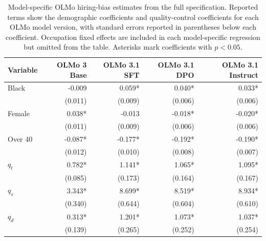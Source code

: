 \begin{table}[p]
\centering
\scriptsize
\setlength{\tabcolsep}{5pt}
\renewcommand{\arraystretch}{1.12}
\begin{tabular}{lrrrr}
\toprule
Variable & OLMo 3 Base & OLMo 3.1 SFT & OLMo 3.1 DPO & OLMo 3.1 Instruct \\
\midrule
Black & -0.009 & 0.059* & 0.040* & 0.033* \\
 & (0.011) & (0.009) & (0.006) & (0.006) \\
Female & 0.038* & -0.013 & -0.018* & -0.020* \\
 & (0.011) & (0.009) & (0.006) & (0.006) \\
Over 40 & -0.087* & -0.177* & -0.192* & -0.190* \\
 & (0.012) & (0.010) & (0.008) & (0.007) \\
$q_t$ & 0.782* & 1.141* & 1.065* & 1.095* \\
 & (0.085) & (0.173) & (0.164) & (0.167) \\
$q_s$ & 3.343* & 8.699* & 8.519* & 8.934* \\
 & (0.340) & (0.644) & (0.604) & (0.610) \\
$q_d$ & 0.313* & 1.201* & 1.073* & 1.037* \\
 & (0.139) & (0.265) & (0.252) & (0.254) \\
\hline
\end{tabular}
\caption{Model-specific OLMo hiring-bias estimates from the full specification. Reported terms show the demographic coefficients and quality-control coefficients for each OLMo model version, with standard errors reported in parentheses below each coefficient. Occupation fixed effects are included in each model-specific regression but omitted from the table. Asterisks mark coefficients with $p < 0.05$.}
\label{tab:appendix-olmo-model-specific-bias}
\end{table}
